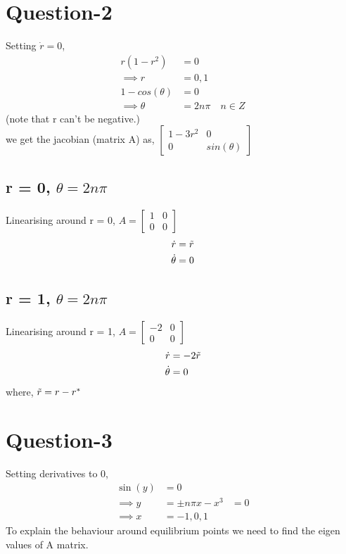 \documentclass{article}
\begin{document}
\section*{Question-2}
Setting $\dot{r} = 0$,
\begin{align}
    r(1-r^2) &= 0 \\
    \implies r &= 0, 1 \\
    1 - cos(\theta) &= 0 \\
    \implies \theta &= 2n\pi \quad n \in Z
\end{align}
(note that r can't be negative.) \\
we get the jacobian (matrix A) as,
$\begin{bmatrix}
1-3r^2 & 0\\
0 & sin(\theta)
\end{bmatrix}$
\subsection*{r = 0, $\theta = 2n\pi$}
Linearising around r = 0,
$A = \begin{bmatrix} 1 & 0 \\ 0 & 0\end{bmatrix} $
\begin{align*}
    \dot{r} &= \Tilde{r} \\
    \dot{\theta} &= 0
\end{align*}
\subsection*{r = 1, $\theta = 2n\pi$}
Linearising around r = 1,
$A = \begin{bmatrix} -2 & 0 \\ 0 & 0\end{bmatrix} $
\begin{align*}
    \dot{r} &= -2\Tilde{r} \\
    \dot{\theta} &= 0
\end{align*}
where, $\Tilde{r} = r-r^*$


\section*{Question-3}
Setting derivatives to 0,
\begin{align*}
    \sin(y) &= 0 \\
    \implies y &= \pm n\pi
    x - x^3 &= 0 \\
    \implies x &= -1, 0, 1
\end{align*}
To explain the behaviour around equilibrium points we need to find the eigen values of A matrix. \\ \\
\end{document}
